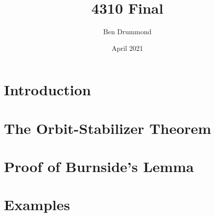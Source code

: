 \documentclass[12pt]{article}
\title{4310 Final}
\author{Ben Drummond}
\date{April 2021}
\begin{document}
    
    

    \section*{Introduction}
    
    
%    
    
    \section*{The Orbit-Stabilizer Theorem}
    
    
    \section*{Proof of Burnside's Lemma}
    
    
    \section*{Examples}
    
    
    
    \clearpage
    
\end{document}
